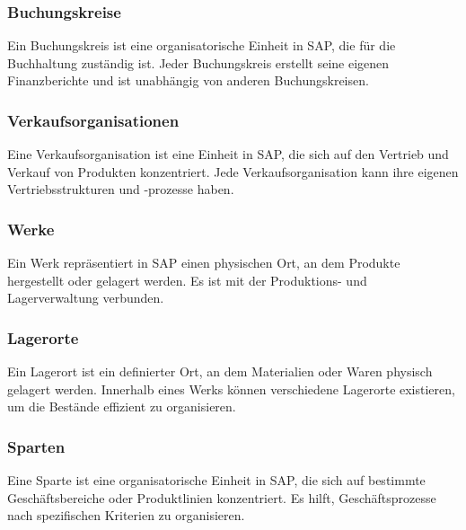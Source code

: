 \documentclass[asp2.tex]{subfiles}
\begin{document}
\subsubsection{Buchungskreise}

\begin{outline}
    \1 Ein Buchungskreis ist eine organisatorische Einheit in SAP, die für 
    die Buchhaltung zuständig ist. 
    \1 Jeder Buchungskreis erstellt seine eigenen Finanzberichte und ist 
    unabhängig von anderen Buchungskreisen.
\end{outline}

\subsubsection{Verkaufsorganisationen}

\begin{outline}
    \1 Eine Verkaufsorganisation ist eine Einheit in SAP, die sich auf den Vertrieb und Verkauf von Produkten konzentriert. 
    \1 Jede Verkaufsorganisation kann ihre eigenen Vertriebsstrukturen und -prozesse haben.
\end{outline}

\subsubsection{Werke}

\begin{outline}
    \1 Ein Werk repräsentiert in SAP einen physischen Ort, an dem Produkte hergestellt oder gelagert werden. 
    \1 Es ist mit der Produktions- und Lagerverwaltung verbunden.
\end{outline}

\subsubsection{Lagerorte}

\begin{outline}
    \1 Ein Lagerort ist ein definierter Ort, an dem Materialien oder Waren physisch gelagert werden. 
    \1 Innerhalb eines Werks können verschiedene Lagerorte existieren, um die Bestände effizient zu organisieren.
\end{outline}

\subsubsection{Sparten}

\begin{outline}
    \1 Eine Sparte ist eine organisatorische Einheit in SAP, die sich auf 
    bestimmte Geschäftsbereiche oder Produktlinien konzentriert. 
    \1 Es hilft, Geschäftsprozesse nach spezifischen Kriterien zu organisieren.
\end{outline}
\end{document}
